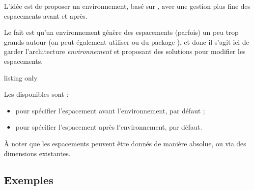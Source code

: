 \documentclass[french,11pt,a4paper]{article}
\begin{document}
L'idée est de proposer un environnement, basé sur , avec une gestion plus fine des espacements avant et après.

Le fait est qu'un environnement  génère des espacements (parfois) un peu trop grands autour (on peut également utiliser  ou  du package ), et donc il s'agit ici de garder l'architecture \textit{environnement} et proposant des solutions pour modifier les espacements.

\begin{DemoCode}{listing only}
\begin{Centrage}[options]
\end{Centrage}
\end{DemoCode}

Les  disponibles sont :

\begin{itemize}
	\item {} pour spécifier l'espacement avant l'environnement,  par défaut ;
	\item {} pour spécifier l'espacement après l'environnement,  par défaut.
\end{itemize}

À noter que les espacements peuvent être donnés de manière absolue, ou via des dimensions existantes.

\subsection{Exemples}

\begin{DemoCode}{}
\lipsum[1][1-3]

\begin{center}
    \lipsum[1][1]
\end{center}

\lipsum[1][1-2]
\end{DemoCode}

\begin{DemoCode}{}
\lipsum[1][1-3]\par

{\centering\lipsum[1][1]\par}

\lipsum[1][1-2]
\end{DemoCode}
\end{document}

